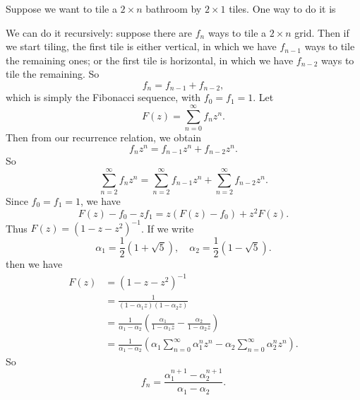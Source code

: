\begin{note}
  \begin{field}
    \begin{eg}
      Suppose we want to tile a $2\times n$ bathroom by $2\times 1$ tiles. One way to do it is
      \begin{center}
      \end{center}
      We can do it recursively: suppose there are $f_n$ ways to tile a $2\times n$ grid. Then if we start tiling, the first tile is either vertical, in which we have $f_{n - 1}$ ways to tile the remaining ones; or the first tile is horizontal, in which we have $f_{n - 2}$ ways to tile the remaining. So
      \[
        f_n = f_{n - 1} + f_{n - 2},
      \]
      which is simply the Fibonacci sequence, with $f_0 = f_1 = 1$.
      Let
      \[
        F(z) = \sum_{n = 0}^\infty f_nz^n.
      \]
      Then from our recurrence relation, we obtain
      \[
        f_nz^n = f_{n - 1}z^n + f_{n - 2}z^n.
      \]
      So
      \[
        \sum_{n = 2}^\infty f_n z^n = \sum_{n = 2}^{\infty} f_{n - 1}z^n + \sum_{n = 2}^\infty f_{n - 2}z^n.
      \]
      Since $f_0 = f_1 = 1$, we have
      \[
        F(z) - f_0 - zf_1 = z(F(z) - f_0) + z^2F(z).
      \]
      Thus $F(z) = (1 - z - z^2)^{-1}$. If we write
      \[
        \alpha_1 = \frac{1}{2}(1 + \sqrt{5}),\quad \alpha_2 = \frac{1}{2}(1 - \sqrt{5}).
      \]
      then we have
      \begin{align*}
        F(z) &= (1 - z - z^2)^{-1}\\
        &= \frac{1}{(1 - \alpha_1 z)(1 - \alpha_2 z)}\\
        &= \frac{1}{\alpha_1 - \alpha_2}\left(\frac{\alpha_1}{1 - \alpha_1 z} - \frac{\alpha_2}{1 - \alpha_2 z}\right)\\
        &= \frac{1}{\alpha_1 - \alpha_2}\left(\alpha_1 \sum_{n = 0}^\infty \alpha_1^nz^n - \alpha_2\sum_{n = 0}^\infty \alpha_2^n z^n\right).
      \end{align*}
      So
      \[
        f_n = \frac{\alpha_1^{n + 1} - \alpha_2^{n + 1}}{\alpha_1 - \alpha_2}.
      \]
    \end{eg}
  \end{field}
  \xplain{}%
\end{note}

